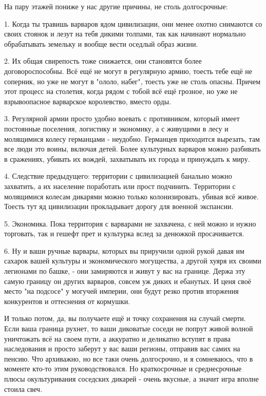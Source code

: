 На пару этажей пониже у нас другие причины, не столь долгосрочные:


1. Когда ты травишь варваров ядом цивилизации, они менее охотно снимаются со своих стоянок и лезут на тебя дикими толпами, так как начинают нормально обрабатывать земельку и вообще вести оседлый образ жизни.


2. Их общая свирепость тоже снижается, они становятся более договороспособны. Всё ещё не могут в регулярную армию, тоесть тебе ещё не соперник, но уже не могут в "ололо, набег", тоесть уже не столь опасны. Причем этот процесс на столетия, когда рядом с тобой всё ещё грозное, но уже не взрывоопасное варварское королевство, вместо орды.


3. Регулярной армии просто удобно воевать с противником, который имеет постоянные поселения, логистику и экономику, а с живущими в лесу и молящимися колесу германцами - неудобно. Германцев приходится вырезать, там все люди это воины, включая детей. Более культурных варваров можно разбивать в сражениях, убивать их вождей, захватывать их города и принуждать к миру.


4. Следствие предыдущего: территории с цивилизацией банально можно захватить, а их население поработать или прост подчинить. Территории с молящимися колесам дикарями можно только колонизировать, убивая всё живое. Тоесть тут яд цивилизации прокладывает дорогу для военной экспансии.


5. Экономика. Пока территория с варварами не захвачена, с ней можно и нужно торговать, так и гешефт прет и культурка вслед за денюжкой просачивается.


6. Ну и ваши ручные варвары, которых вы приручили одной рукой давая им сахарок вашей культуры и экономического могущества, а другой хуяря их своими легионами по башке, - они замиряются и живут у вас на границе. Держа эту самую границу он других варваров, совсем уж диких и ебанутых. И ценя своё место "на подсосе" у могучей империи, они будут резко против вторжения конкурентов и оттеснения от кормушки.


И только потом, да, вы получаете ещё и точку сохранения на случай смерти. Если ваша граница рухнет, то ваши диковатые соседи не попрут живой волной уничтожать всё на своем пути, а аккуратно и деликатно вступят в права наследования и просто заберут у вас ваши регионы, отправив вас самих на пенсию. Что архиважно, но все таки очень долгосрочно, и я сомневаюсь, что в моменте кто-то этим руководствовался. Но краткосрочные и среднесрочные плюсы окультуривания соседских дикарей - очень вкусные, а значит игра вполне стоила свеч.


